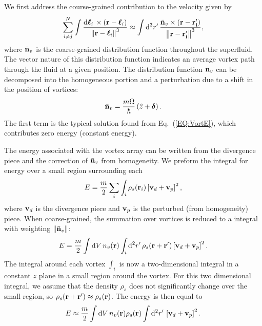 \documentclass[onecolumn,nofootinbib,superscriptaddress]{revtex4}
\newcommand{\dd}[1]{\mathrm{d}#1\,}
\newcommand{\bfell}{\boldsymbol \ell}
\begin{document}
We first address the course-grained contribution to the velocity given by
\begin{equation}
\sum_{i\neq j}^N \int \frac{\dd{\bfell_i}\times\left({\bf r} - \bfell_i\right)}{\left\|{\bf r} - \bfell_i\right\|^3}  \approx \int \dd{^3 r'}\frac{\bar{\bf n}_v\times\left(\bf{r}-\bf{r}'_i\right)}{\left\|\bf{r}-\bf{r}'_i\right\|^3},
\end{equation}
where $\bar{\bf n}_v$ is the coarse-grained distribution function throughout the superfluid.  The vector nature of this distribution function indicates an average vortex path through the fluid at a given position.  The distribution function $\bar{\bf n}_v$ can be decomposed into the homogeneous portion and a perturbation due to a shift in the position of vortices:
\begin{equation}
\bar{\bf n}_v = \frac{m\Omega}{\hbar}\left(\hat{z}+{\boldsymbol \delta}\right).
\end{equation}
The first term is the typical solution found from Eq.~(\ref{EQ:VortE}), which contributes zero energy (constant energy).

The energy  associated with the vortex array can be written from the divergence piece and the correction of $\bar{\bf n}_v$ from homogeneity.  We preform the integral for energy over a small region surrounding each
\begin{equation}
E = \frac{m}{2}\sum_i \int_i \rho_s({\bf r}_i)\left[{\bf v}_d + {\bf v}_p\right]^2,
\end{equation}
where ${\bf v}_d$ is the divergence piece and ${\bf v}_p$ is the perturbed (from homogeneity) piece.  When coarse-grained, the summation over vortices is reduced to a integral with weighting $\|\bar{\bf n}_v\|$:
\begin{equation}
E = \frac{m}{2}\int\dd{V} n_v({\bf r}) \int_i \dd{^2 r'} \rho_s({\bf r} + {\bf r}')\left[{\bf v}_d + {\bf v}_p\right]^2.
\end{equation}
The integral around each vortex $\int_i$ is now a two-dimensional integral in a constant $z$ plane in a small region around the vortex.  For this two dimensional integral, we assume that the density $\rho_s$ does not significantly change over the small region, so $\rho_s({\bf r+r}') \approx \rho_s({\bf r})$.  The energy is then equal to
\begin{equation}
E\approx \frac{m}{2}\int\dd{V} n_v({\bf r}) \rho_s({\bf r})\int \dd{^2 r'} \left[{\bf v}_d + {\bf v}_p\right]^2. \label{EQ:TotalEn}
\end{equation}
\end{document}
